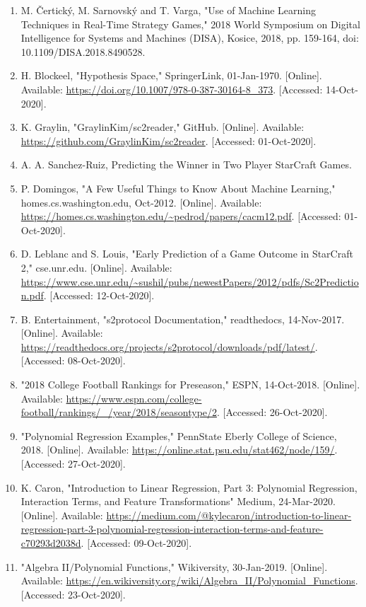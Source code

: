 \documentclass[a4paper,12pt]{report}
\begin{document}
\begin{enumerate}
\item M. Čertický, M. Sarnovský and T. Varga, "Use of Machine Learning Techniques in Real-Time Strategy Games," 2018 World Symposium on Digital Intelligence for Systems and Machines (DISA), Kosice, 2018, pp. 159-164, doi: 10.1109/DISA.2018.8490528.
\item H. Blockeel, "Hypothesis Space," SpringerLink, 01-Jan-1970. [Online]. Available: \url{https://doi.org/10.1007/978-0-387-30164-8_373}. [Accessed: 14-Oct-2020].
\item K. Graylin, "GraylinKim/sc2reader," GitHub. [Online]. Available: \url{https://github.com/GraylinKim/sc2reader}. [Accessed: 01-Oct-2020].
\item A. A. Sanchez-Ruiz, Predicting the Winner in Two Player StarCraft Games.
\item P. Domingos, "A Few Useful Things to Know About Machine Learning," homes.cs.washington.edu, Oct-2012. [Online]. Available: \url{https://homes.cs.washington.edu/~pedrod/papers/cacm12.pdf}. [Accessed: 01-Oct-2020]. 
\item D. Leblanc and S. Louis, "Early Prediction of a Game Outcome in StarCraft 2," cse.unr.edu. [Online]. Available: \url{https://www.cse.unr.edu/~sushil/pubs/newestPapers/2012/pdfs/Sc2Prediction.pdf}. [Accessed: 12-Oct-2020]. 
\item B. Entertainment, "s2protocol Documentation," readthedocs, 14-Nov-2017. [Online]. Available: \url{https://readthedocs.org/projects/s2protocol/downloads/pdf/latest/}. [Accessed: 08-Oct-2020]. 
\item "2018 College Football Rankings for Preseason," ESPN, 14-Oct-2018. [Online]. Available: \url{https://www.espn.com/college-football/rankings/_/year/2018/seasontype/2}. [Accessed: 26-Oct-2020]. 
\item "Polynomial Regression Examples," PennState Eberly College of Science, 2018. [Online]. Available: \url{https://online.stat.psu.edu/stat462/node/159/}. [Accessed: 27-Oct-2020]. 
\item K. Caron, "Introduction to Linear Regression, Part 3: Polynomial Regression, Interaction Terms, and Feature Transformations" Medium, 24-Mar-2020. [Online]. Available: \url{https://medium.com/@kylecaron/introduction-to-linear-regression-part-3-polynomial-regression-interaction-terms-and-feature-c70293d2038d}. [Accessed: 09-Oct-2020]. 
\item "Algebra II/Polynomial Functions," Wikiversity, 30-Jan-2019. [Online]. Available: \url{https://en.wikiversity.org/wiki/Algebra_II/Polynomial_Functions}. [Accessed: 23-Oct-2020]. 

\end{enumerate}
\end{document}
